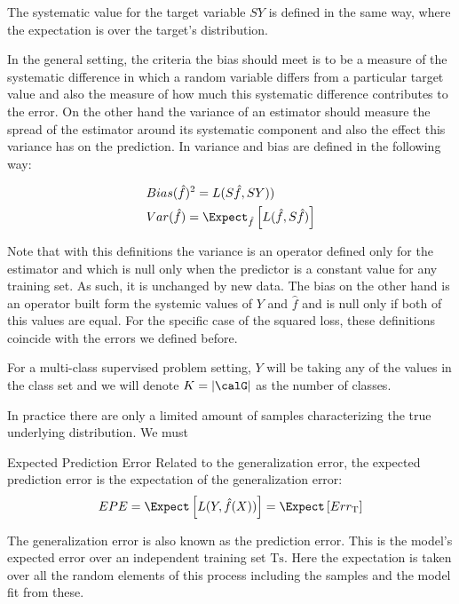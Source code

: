 The systematic value for the target variable $SY$ is defined in the same way, where the expectation is over the target's distribution. 

In the general setting, the criteria the bias should meet is to be a measure of the systematic difference in which a random variable differs from a particular target value and also the measure of how much this systematic difference contributes to the error. On the other hand the variance of an estimator should measure the spread of the estimator around its systematic component and also the effect this variance has on the prediction. In \cite{james-biasVarianceGeneral} variance and bias are defined in the following way:


\begin{equation}
\begin{split}
& Bias(\hat{f})^2 = L(S\hat{f},SY)) \\
& Var(\hat{f}) = \Expect_{\hat{f}} \left[  L(\hat{f}  , S\hat{f}) \right]
\end{split}
\end{equation}

Note that with this definitions the variance is an operator defined only for the estimator and which is null only when the predictor is a constant value for any training set. As such, it is unchanged by new data. The bias on the other hand is an operator built form the systemic values of $Y$ and $\hat{f}$ and is null only if both of this values are equal.
For the specific case of the squared loss, these definitions coincide with the errors we defined before.


For a  multi-class supervised problem setting, $Y$ will be taking any of the values in the class set \calG and we will denote $K = |\calG|$ as the number of classes.

In practice there are only a limited amount of samples characterizing the true underlying distribution. We must 

\begin{definition}{Expected Prediction Error}
	Related to the generalization error, the expected prediction error is the expectation of the generalization error:
	$$ EPE = \Expect \left[ L(Y,\hat{f}(X))\right] =  \Expect \left[ Err_{\mathrm{T}}  \right]$$
\end{definition}

The generalization error is also known as the prediction error. This is the model's expected error over an independent training set $\mathrm{Ts}$. Here the expectation is taken over all the random elements of this process including the samples and the model fit from these. 

